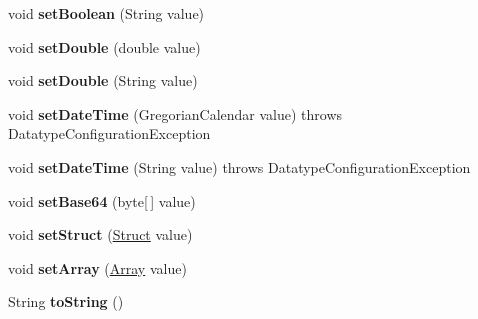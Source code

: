 \begin{DoxyCompactItemize}
void {\bfseries set\+Boolean} (String value)
\item 
\mbox{\label{classcom_1_1mysql_1_1fabric_1_1xmlrpc_1_1base_1_1_value_aff456854323cea04205d32cfed641cd5}} 
void {\bfseries set\+Double} (double value)
\item 
\mbox{\label{classcom_1_1mysql_1_1fabric_1_1xmlrpc_1_1base_1_1_value_aaf054f4d89cea6ee3496665ae0bd2256}} 
void {\bfseries set\+Double} (String value)
\item 
\mbox{\label{classcom_1_1mysql_1_1fabric_1_1xmlrpc_1_1base_1_1_value_a78639948be5825993a7f450f1caa91b3}} 
void {\bfseries set\+Date\+Time} (Gregorian\+Calendar value)  throws Datatype\+Configuration\+Exception 
\item 
\mbox{\label{classcom_1_1mysql_1_1fabric_1_1xmlrpc_1_1base_1_1_value_a477a0bfc89d7e5b3799431e9a688e5b4}} 
void {\bfseries set\+Date\+Time} (String value)  throws Datatype\+Configuration\+Exception 
\item 
\mbox{\label{classcom_1_1mysql_1_1fabric_1_1xmlrpc_1_1base_1_1_value_aacdede4c422f06a8658a8b7a4fd419b4}} 
void {\bfseries set\+Base64} (byte\mbox{[}$\,$\mbox{]} value)
\item 
\mbox{\label{classcom_1_1mysql_1_1fabric_1_1xmlrpc_1_1base_1_1_value_a31a76c6babcb552da92f20ad960fd1e0}} 
void {\bfseries set\+Struct} (\mbox{\hyperlink{classcom_1_1mysql_1_1fabric_1_1xmlrpc_1_1base_1_1_struct}{Struct}} value)
\item 
\mbox{\label{classcom_1_1mysql_1_1fabric_1_1xmlrpc_1_1base_1_1_value_a0e67095e69faf84c34f34b4fbdb4c98b}} 
void {\bfseries set\+Array} (\mbox{\hyperlink{classcom_1_1mysql_1_1fabric_1_1xmlrpc_1_1base_1_1_array}{Array}} value)
\item 
\mbox{\label{classcom_1_1mysql_1_1fabric_1_1xmlrpc_1_1base_1_1_value_a101f5b48dd43333e055b2fe43b1353ca}} 
String {\bfseries to\+String} ()
\end{DoxyCompactItemize}
